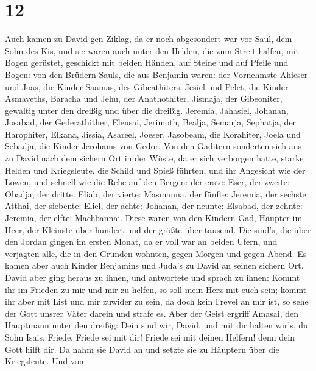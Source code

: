 \hypertarget{section-11}{%
\section{12}\label{section-11}}

 Auch kamen zu David gen Ziklag, da er noch abgesondert war
vor Saul, dem Sohn des Kis, und sie waren auch unter den Helden, die zum
Streit halfen,  mit Bogen gerüstet, geschickt mit beiden
Händen, auf Steine und auf Pfeile und Bogen: von den Brüdern Sauls, die
aus Benjamin waren:  der Vornehmste Ahieser und Joas, die
Kinder Saamas, des Gibeathiters, Jesiel und Pelet, die Kinder Asmaveths,
Baracha und Jehu, der Anathothiter,  Jismaja, der
Gibeoniter, gewaltig unter den dreißig und über die dreißig. Jeremia,
Jahasiel, Johanan, Josabad, der Gederathither,  Eleusai,
Jerimoth, Bealja, Semarja, Sephatja, der Harophiter, 
Elkana, Jissia, Asareel, Joeser, Jasobeam, die Korahiter, 
Joela und Sebadja, die Kinder Jerohams von Gedor.  Von den
Gaditern sonderten sich aus zu David nach dem sichern Ort in der Wüste,
da er sich verborgen hatte, starke Helden und Kriegsleute, die Schild
und Spieß führten, und ihr Angesicht wie der Löwen, und schnell wie die
Rehe auf den Bergen:  der erste: Eser, der zweite: Obadja,
der dritte: Eliab,  der vierte: Masmanna, der fünfte:
Jeremia,  der sechste: Atthai, der siebente: Eliel,
 der achte: Johanan, der neunte: Elsabad,  der
zehnte: Jeremia, der elfte: Machbannai.  Diese waren von
den Kindern Gad, Häupter im Heer, der Kleinste über hundert und der
größte über tausend.  Die sind's, die über den Jordan
gingen im ersten Monat, da er voll war an beiden Ufern, und verjagten
alle, die in den Gründen wohnten, gegen Morgen und gegen Abend.
 Es kamen aber auch Kinder Benjamins und Juda's zu David an
seinen sichern Ort.  David aber ging heraus zu ihnen, und
antwortete und sprach zu ihnen: Kommt ihr im Frieden zu mir und mir zu
helfen, so soll mein Herz mit euch sein; kommt ihr aber mit List und mir
zuwider zu sein, da doch kein Frevel an mir ist, so sehe der Gott unsrer
Väter darein und strafe es.  Aber der Geist ergriff Amasai,
den Hauptmann unter den dreißig: Dein sind wir, David, und mit dir
halten wir's, du Sohn Isais. Friede, Friede sei mit dir! Friede sei mit
deinen Helfern! denn dein Gott hilft dir. Da nahm sie David an und
setzte sie zu Häuptern über die Kriegsleute.  Und von
